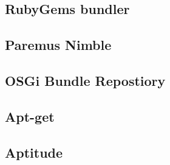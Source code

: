 \subsection{RubyGems bundler}


\subsection{Paremus Nimble}

\subsection{OSGi Bundle Repostiory}

\subsection{Apt-get}

\subsection{Aptitude}


